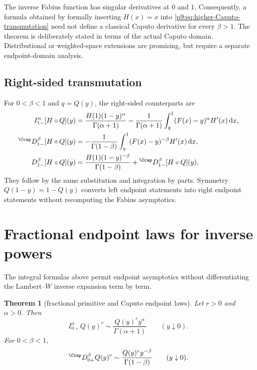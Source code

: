 \documentclass[11pt,oneside]{article}
\newtheorem{theorem}{Theorem}[section]
\theoremstyle{definition}
\theoremstyle{remark}
\newcommand{\dd}{\,\mathrm d}
\newcommand{\1}{\mathbf 1}
\begin{document}
\begin{warningbox}
The inverse Fabius function has singular derivatives at $0$ and $1$.
Consequently, a formula obtained by formally inserting $H(x)=x$ into
\cref{p9:eq:higher-Caputo-transmutation} need not define a classical Caputo
derivative for every $\beta>1$.  The theorem is deliberately stated in terms
of the actual Caputo domain.  Distributional or weighted-space extensions are
promising, but require a separate endpoint-domain analysis.
\end{warningbox}

\subsection{Right-sided transmutation}

For $0<\beta<1$ and $q=Q(y)$, the right-sided counterparts are
\begin{align}
 I_{1-}^\alpha[H\circ Q](y)
 &=\frac{H(1)(1-y)^\alpha}{\Gamma(\alpha+1)}
   -\frac1{\Gamma(\alpha+1)}
    \int_q^1(F(x)-y)^\alpha H'(x)\dd x,
 \label{p9:eq:right-RL-transmutation}\\
 {}^{\Ccap}D_{1-}^\beta[H\circ Q](y)
 &=-\frac1{\Gamma(1-\beta)}
   \int_q^1(F(x)-y)^{-\beta}H'(x)\dd x,
 \label{p9:eq:right-Caputo-transmutation}\\
 D_{1-}^\beta[H\circ Q](y)
 &=\frac{H(1)(1-y)^{-\beta}}{\Gamma(1-\beta)}
   +{}^{\Ccap}D_{1-}^\beta[H\circ Q](y).
 \label{p9:eq:right-RL-Caputo}
\end{align}
They follow by the same substitution and integration by parts.  Symmetry
$Q(1-y)=1-Q(y)$ converts left endpoint statements into right endpoint
statements without recomputing the Fabius asymptotics.

\section{Fractional endpoint laws for inverse powers}
\label{p9:sec:endpoint-fractional}

The integral formulas above permit endpoint asymptotics without differentiating
the Lambert--$W$ inverse expansion term by term.

\begin{theorem}[fractional primitive and Caputo endpoint laws]
\label{p9:thm:Q-fractional-endpoint}
Let $r>0$ and $\alpha>0$.  Then
\begin{equation}
 I_{0+}^\alpha Q(y)^r
 \sim\frac{Q(y)^r y^\alpha}{\Gamma(\alpha+1)}
 \qquad(y\downarrow0).
 \label{p9:eq:Q-RL-endpoint}
\end{equation}
For $0<\beta<1$,
\begin{equation}
 {}^{\Ccap}D_{0+}^\beta Q(y)^r
 \sim\frac{Q(y)^r y^{-\beta}}{\Gamma(1-\beta)}
 \qquad(y\downarrow0).
 \label{p9:eq:Q-Caputo-endpoint}
\end{equation}
\end{theorem}
\end{document}
